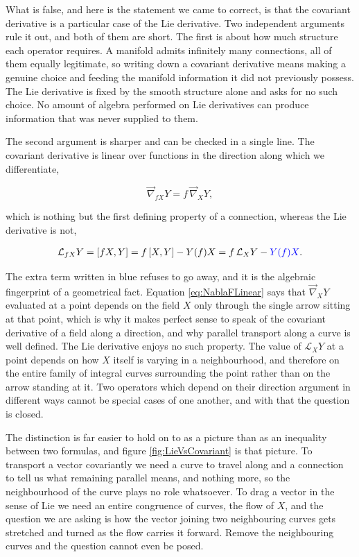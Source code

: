         What is false, and here is the statement we came to correct, is that the covariant derivative is a particular case of the Lie derivative. Two independent arguments rule it out, and both of them are short. The first is about how much structure each operator requires. A manifold admits infinitely many connections, all of them equally legitimate, so writing down a covariant derivative means making a genuine choice and feeding the manifold information it did not previously possess. The Lie derivative is fixed by the smooth structure alone and asks for no such choice. No amount of algebra performed on Lie derivatives can produce information that was never supplied to them.

        The second argument is sharper and can be checked in a single line. The covariant derivative is linear over functions in the direction along which we differentiate,

        \begin{equation}\label{eq:NablaFLinear}
            \Vec{\nabla}_{fX}Y = f\,\Vec{\nabla}_XY,
        \end{equation}

        which is nothing but the first defining property of a connection, whereas the Lie derivative is not,

        \begin{align*}
            \mathcal{L}_{fX}Y = \left[fX,Y\right] = f\left[X,Y\right] - Y(f)X = f\,\mathcal{L}_XY - {\color{blue}Y(f)X}.
        \end{align*}

        The extra term written in blue refuses to go away, and it is the algebraic fingerprint of a geometrical fact. Equation \ref{eq:NablaFLinear} says that $\Vec{\nabla}_XY$ evaluated at a point depends on the field $X$ only through the single arrow sitting at that point, which is why it makes perfect sense to speak of the covariant derivative of a field along a direction, and why parallel transport along a curve is well defined. The Lie derivative enjoys no such property. The value of $\mathcal{L}_XY$ at a point depends on how $X$ itself is varying in a neighbourhood, and therefore on the entire family of integral curves surrounding the point rather than on the arrow standing at it. Two operators which depend on their direction argument in different ways cannot be special cases of one another, and with that the question is closed.

        The distinction is far easier to hold on to as a picture than as an inequality between two formulas, and figure \ref{fig:LieVsCovariant} is that picture. To transport a vector covariantly we need a curve to travel along and a connection to tell us what remaining parallel means, and nothing more, so the neighbourhood of the curve plays no role whatsoever. To drag a vector in the sense of Lie we need an entire congruence of curves, the flow of $X$, and the question we are asking is how the vector joining two neighbouring curves gets stretched and turned as the flow carries it forward. Remove the neighbouring curves and the question cannot even be posed.

